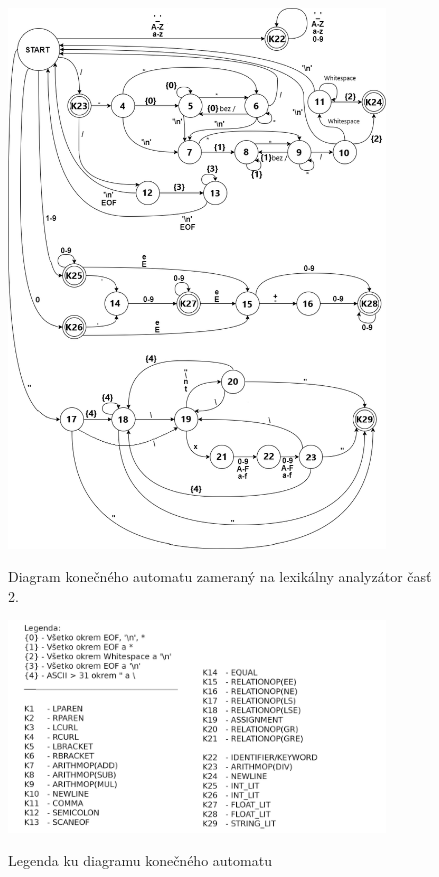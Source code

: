 \documentclass[a4paper,11pt]{article}
\begin{document}
			\begin{figure}[h]
				\centering
				\includegraphics[width = 10cm]{LA_KA_2.png}\\
				\caption{Diagram konečného automatu zameraný na lexikálny analyzátor časť 2.}
				\label{fig:diaglex2}
			\end{figure}

			\begin{figure}[h]
				\centering
				\includegraphics[width = 10cm]{legenda.png}\\
				\caption{Legenda ku diagramu konečného automatu}
				\label{fig:legenda}
			\end{figure}

		\cleardoublepage
\end{document}
